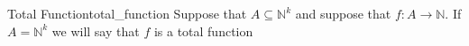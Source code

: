 \begin{definition}{Total Function}{total_function}
Suppose that $A \subseteq \mathbb{N}^{k}$ and suppose that $f: A \rightarrow \mathbb{N}$. If $A=\mathbb{N}^{k}$ we will say that $f$ is a total function
\end{definition}
